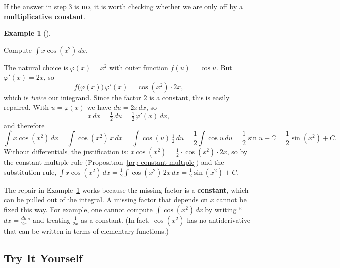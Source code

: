 \documentclass[
  letterpaper,
  DIV=11,
  numbers=noendperiod]{scrreprt}
\theoremstyle{plain}
\theoremstyle{plain}
\theoremstyle{definition}
\theoremstyle{definition}
\theoremstyle{definition}
\newtheorem{example}{Example}[chapter]
\theoremstyle{plain}
\theoremstyle{plain}
\theoremstyle{remark}
\begin{document}
If the answer in step 3 is \textbf{no}, it is worth checking whether we
are only off by a \textbf{multiplicative constant}.

\begin{example}[]\protect\hypertarget{exm-substitution-constant}{}\label{exm-substitution-constant}

\hfill\break
Compute \(\displaystyle\int x\cos(x^2)\,dx\).

The natural choice is \(\varphi(x) = x^2\) with outer function
\(f(u) = \cos u\). But \(\varphi'(x) = 2x\), so \[
f\big(\varphi(x)\big)\,\varphi'(x) = \cos(x^2)\cdot2x ,
\] which is \emph{twice} our integrand. Since the factor \(2\) is a
constant, this is easily repaired. With \(u = \varphi(x)\) we have
\(du = 2x\,dx\), so \[
x\,dx = \tfrac12\,du = \tfrac12\,\varphi'(x)\,dx ,
\] and therefore \[
\int x\cos(x^2)\,dx = \int\cos(x^2)\,x\,dx = \int\cos(u)\,\tfrac12\,du
= \frac12\int\cos u\,du = \frac12\sin u + C = \frac12\sin(x^2)+C .
\] Without differentials, the justification is:
\(x\cos(x^2) = \frac12\cdot\cos(x^2)\cdot2x\), so by the constant
multiple rule (Proposition~\ref{prp-constant-multiple}) and the
substitution rule,
\(\int x\cos(x^2)\,dx = \frac12\int \cos(x^2)\,2x\,dx = \frac12\sin(x^2)+C\).

\end{example}

\begin{tcolorbox}[enhanced jigsaw, arc=.35mm, bottomrule=.15mm, bottomtitle=1mm, breakable, colback=white, colbacktitle=quarto-callout-warning-color!10!white, colframe=quarto-callout-warning-color-frame, coltitle=black, left=2mm, leftrule=.75mm, opacityback=0, opacitybacktitle=0.6, rightrule=.15mm, title={Only constants can be moved around}, titlerule=0mm, toprule=.15mm, toptitle=1mm]

The repair in Example~\ref{exm-substitution-constant} works because the
missing factor is a \textbf{constant}, which can be pulled out of the
integral. A missing factor that depends on \(x\) cannot be fixed this
way. For example, one cannot compute \(\int\cos(x^2)\,dx\) by writing
``\(dx = \frac{du}{2x}\)'' and treating \(\frac{1}{2x}\) as a constant.
(In fact, \(\cos(x^2)\) has no antiderivative that can be written in
terms of elementary functions.)

\end{tcolorbox}

\subsection{Try It Yourself}\label{try-it-yourself-1}
\end{document}
